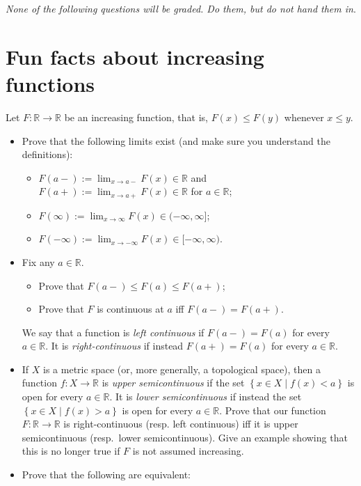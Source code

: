 \documentclass{qlnotes-export}
\begin{document}
\emph{None of the following questions will be graded. Do them, but do not hand them in}.

\section{Fun facts about increasing functions}\label{fun-facts-about-increasing-functions}

Let \(F:{\mathbb{R}}\rightarrow{\mathbb{R}}\) be an increasing function, that is, \(F(x) \leq F(y)\) whenever \(x \leq y\).

\begin{itemize}
\item
  Prove that the following limits exist (and make sure you understand the definitions):

  \begin{itemize}
  \item
    \(F(a - ) := \lim_{x\rightarrow a -}F(x) \in {\mathbb{R}}\) and \(F(a + ) := \lim_{x\rightarrow a +}F(x) \in {\mathbb{R}}\) for \(a \in {\mathbb{R}}\);
  \item
    \(F(\infty) := \lim_{x\rightarrow\infty}F(x) \in ( - \infty,\infty\rbrack\);
  \item
    \(F( - \infty) := \lim_{x\rightarrow - \infty}F(x) \in \lbrack - \infty,\infty)\).
  \end{itemize}
\item
  Fix any \(a \in {\mathbb{R}}\).

  \begin{itemize}
  \item
    Prove that \(F(a - ) \leq F(a) \leq F(a + )\);
  \item
    Prove that \(F\) is continuous at \(a\) iff \(F(a - ) = F(a + )\).
  \end{itemize}

  We say that a function is \emph{left continuous} if \(F(a - ) = F(a)\) for every \(a \in {\mathbb{R}}\). It is \emph{right-continuous} if instead \(F(a + ) = F(a)\) for every \(a \in {\mathbb{R}}\).
\item
  If \(X\) is a metric space (or, more generally, a topological space), then a function \(f:X\rightarrow{\mathbb{R}}\) is \emph{upper semicontinuous} if the set \(\left\{ {x \in X \mid f(x) < a} \right\}\) is open for every \(a \in {\mathbb{R}}\). It is \emph{lower semicontinuous} if instead the set \(\left\{ {x \in X \mid f(x) > a} \right\}\) is open for every \(a \in {\mathbb{R}}\). Prove that our function \(F:{\mathbb{R}}\rightarrow{\mathbb{R}}\) is right-continuous (resp. left continuous) iff it is upper semicontinuous (resp.~lower semicontinuous). Give an example showing that this is no longer true if \(F\) is not assumed increasing.
\item
  Prove that the following are equivalent:


\end{itemize}
\end{document}
